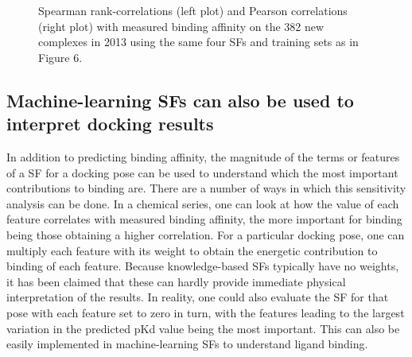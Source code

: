 \begin{figure}
\centering
{}
\caption{Spearman rank-correlations (left plot) and Pearson correlations (right plot) with measured binding affinity on the 382 new complexes in 2013 using the same four SFs and training sets as in Figure 6.}
\label{rfscore3:partitions2345RsRp}
\end{figure}

\subsection{Machine-learning SFs can also be used to interpret docking results}

In addition to predicting binding affinity, the magnitude of the terms or features of a SF for a docking pose can be used to understand which the most important contributions to binding are. There are a number of ways in which this sensitivity analysis can be done. In a chemical series, one can look at how the value of each feature correlates with measured binding affinity, the more important for binding being those obtaining a higher correlation. For a particular docking pose, one can multiply each feature with its weight to obtain the energetic contribution to binding of each feature. Because knowledge-based SFs typically have no weights, it has been claimed \citep{1372} that these can hardly provide immediate physical interpretation of the results. In reality, one could also evaluate the SF for that pose with each feature set to zero in turn, with the features leading to the largest variation in the predicted pKd value being the most important. This can also be easily implemented in machine-learning SFs to understand ligand binding.

